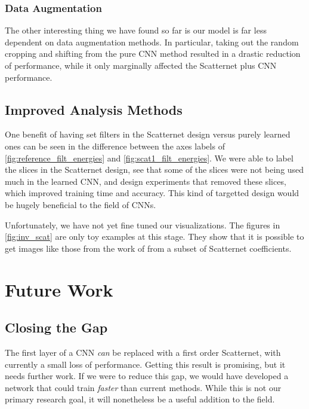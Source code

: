 \subsubsection{Data Augmentation}
  The other interesting thing we have found so far is our model is far less
  dependent on data augmentation methods. In particular, taking out the random
  cropping and shifting from the pure CNN method resulted in a drastic
  reduction of performance, while it only marginally affected the Scatternet
  plus CNN performance.

\subsection{Improved Analysis Methods}
  One benefit of having set filters in the Scatternet design versus purely
  learned ones can be seen in the difference between the axes labels of
  \autoref{fig:reference_filt_energies} and \autoref{fig:scat1_filt_energies}.
  We were able to label the slices in the Scatternet design, see that some of
  the slices were not being used much in the learned CNN, and design
  experiments that removed these slices, which improved training time and
  accuracy. This kind of targetted design would be
  hugely beneficial to the field of CNNs.

  Unfortunately, we have not yet fine tuned our visualizations. The figures in
  \autoref{fig:inv_scat} are only toy examples at this stage. They show that
  it is possible to get images like those from the work of
  \citet{zeiler_visualizing_compact_2014} from a subset of Scatternet
  coefficients. 

\section{Future Work}\label{sec:future_work}
  
\subsection{Closing the Gap}\label{sec:closing_the_gap}
  The first layer of a CNN \emph{can} be replaced with a first order
  Scatternet, with currently a small loss of performance.  Getting this result is
  promising, but it needs further work. If we were to reduce this gap, we would
  have developed a network that could train \emph{faster} than current methods.
  While this is not our primary research goal, it will nonetheless be a useful
  addition to the field.

